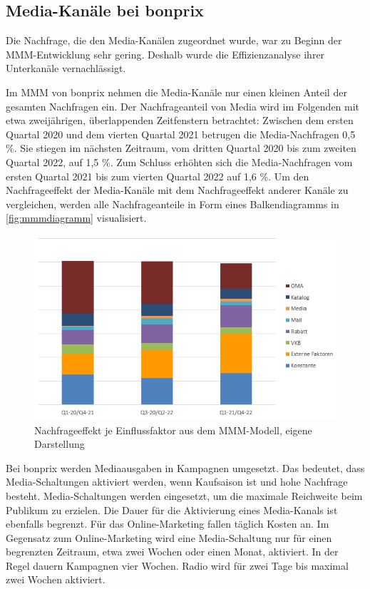 \subsection{Media-Kanäle bei bonprix} 
\label{MediaKanäleBeiBonprix}
Die Nachfrage, die den Media-Kanälen zugeordnet wurde, war zu Beginn der \ac{MMM}-Entwicklung sehr gering. Deshalb wurde die Effizienzanalyse ihrer Unterkanäle vernachlässigt. \par
Im \ac{MMM} von bonprix nehmen die Media-Kanäle nur einen kleinen Anteil der gesamten Nachfragen ein. Der Nachfrageanteil von Media wird im Folgenden mit etwa zweijährigen, überlappenden Zeitfenstern betrachtet: Zwischen dem ersten Quartal 2020 und dem vierten Quartal 2021 betrugen die Media-Nachfragen 0,5 \%. Sie stiegen im nächsten Zeitraum, vom dritten Quartal 2020 bis zum zweiten Quartal 2022, auf 1,5 \%. Zum Schluss erhöhten sich die Media-Nachfragen vom ersten Quartal 2021 bis zum vierten Quartal 2022 auf 1,6 \%. Um den Nachfrageeffekt der Media-Kanäle mit dem Nachfrageeffekt anderer Kanäle zu vergleichen, werden alle Nachfrageanteile in Form eines Balkendiagramms in \autoref{fig:mmmdiagramm} visualisiert. 
\begin{figure}[H]
    \centering
    \includegraphics[width=0.75\linewidth]{images/mmmdiagramm.png}
    \caption{Nachfrageeffekt je Einflussfaktor aus dem \ac{MMM}-Modell, eigene Darstellung }
    \label{fig:mmmdiagramm}
\end{figure}
\noindent
Bei bonprix werden Mediaausgaben in Kampagnen umgesetzt. Das bedeutet, dass Media-Schaltungen aktiviert werden, wenn Kaufsaison ist und hohe Nachfrage besteht. Media-Schaltungen werden eingesetzt, um die maximale Reichweite beim Publikum zu erzielen. Die Dauer für die Aktivierung eines Media-Kanals ist ebenfalls begrenzt. Für das Online-Marketing fallen täglich Kosten an. Im Gegensatz zum Online-Marketing wird eine Media-Schaltung nur für einen begrenzten Zeitraum, etwa zwei Wochen oder einen Monat, aktiviert. In der Regel dauern Kampagnen vier Wochen. Radio wird für zwei Tage bis maximal zwei Wochen aktiviert. \par
